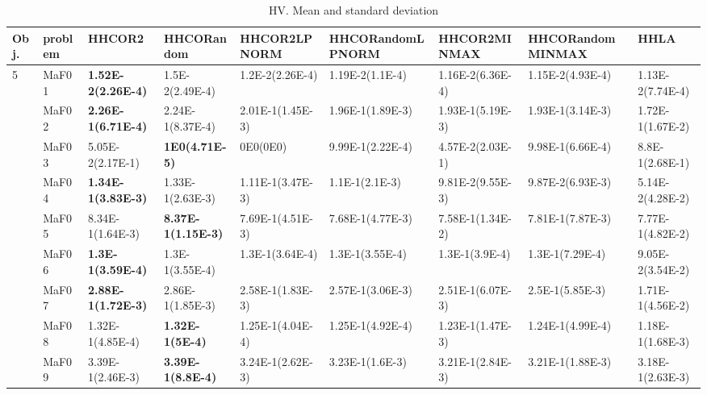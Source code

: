 \documentclass[]{article}
\begin{document}
\begin{landscape}
\begin{table}
\caption{HV. Mean and standard deviation}
\label{table:mean.HV}
\centering
\begin{footnotesize}
\begin{tabular}{|l|l|l|l|l|l|l|l|l|}
\hline
Obj. & problem  & HHCOR2 & HHCORandom & HHCOR2LPNORM & HHCORandomLPNORM & HHCOR2MINMAX & HHCORandomMINMAX & HHLA \\ \hline

\multirow{15}{*}{5} & MaF01 & \cellcolor{gray95} {\bf 1.52E-2(2.26E-4)} & \cellcolor{gray95} 1.5E-2(2.49E-4) & 1.2E-2(2.26E-4) & 1.19E-2(1.1E-4) & 1.16E-2(6.36E-4) & 1.15E-2(4.93E-4) & 1.13E-2(7.74E-4)\\
 & MaF02 & \cellcolor{gray95} {\bf 2.26E-1(6.71E-4)} & \cellcolor{gray95} 2.24E-1(8.37E-4) & 2.01E-1(1.45E-3) & 1.96E-1(1.89E-3) & 1.93E-1(5.19E-3) & 1.93E-1(3.14E-3) & 1.72E-1(1.67E-2)\\
 & MaF03 & 5.05E-2(2.17E-1) & \cellcolor{gray95} {\bf 1E0(4.71E-5)} & 0E0(0E0) & \cellcolor{gray95} 9.99E-1(2.22E-4) & 4.57E-2(2.03E-1) & 9.98E-1(6.66E-4) & 8.8E-1(2.68E-1)\\
 & MaF04 & \cellcolor{gray95} {\bf 1.34E-1(3.83E-3)} & \cellcolor{gray95} 1.33E-1(2.63E-3) & 1.11E-1(3.47E-3) & 1.1E-1(2.1E-3) & 9.81E-2(9.55E-3) & 9.87E-2(6.93E-3) & 5.14E-2(4.28E-2)\\
 & MaF05 & \cellcolor{gray95} 8.34E-1(1.64E-3) & \cellcolor{gray95} {\bf 8.37E-1(1.15E-3)} & 7.69E-1(4.51E-3) & 7.68E-1(4.77E-3) & 7.58E-1(1.34E-2) & 7.81E-1(7.87E-3) & 7.77E-1(4.82E-2)\\
 & MaF06 & \cellcolor{gray95} {\bf 1.3E-1(3.59E-4)} & \cellcolor{gray95} 1.3E-1(3.55E-4) & \cellcolor{gray95} 1.3E-1(3.64E-4) & \cellcolor{gray95} 1.3E-1(3.55E-4) & 1.3E-1(3.9E-4) & 1.3E-1(7.29E-4) & 9.05E-2(3.54E-2)\\
 & MaF07 & \cellcolor{gray95} {\bf 2.88E-1(1.72E-3)} & \cellcolor{gray95} 2.86E-1(1.85E-3) & 2.58E-1(1.83E-3) & 2.57E-1(3.06E-3) & 2.51E-1(6.07E-3) & 2.5E-1(5.85E-3) & 1.71E-1(4.56E-2)\\
 & MaF08 & \cellcolor{gray95} 1.32E-1(4.85E-4) & \cellcolor{gray95} {\bf 1.32E-1(5E-4)} & 1.25E-1(4.04E-4) & 1.25E-1(4.92E-4) & 1.23E-1(1.47E-3) & 1.24E-1(4.99E-4) & 1.18E-1(1.68E-3)\\
 & MaF09 & \cellcolor{gray95} 3.39E-1(2.46E-3) & \cellcolor{gray95} {\bf 3.39E-1(8.8E-4)} & 3.24E-1(2.62E-3) & 3.23E-1(1.6E-3) & 3.21E-1(2.84E-3) & 3.21E-1(1.88E-3) & 3.18E-1(2.63E-3)\\

\end{tabular}
\end{footnotesize}
\end{table}
\end{landscape}
\end{document}
